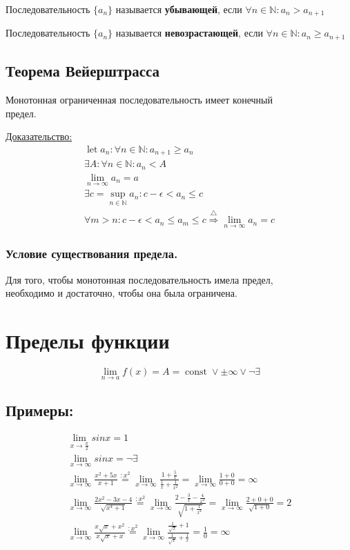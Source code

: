 \documentclass{article}
\DeclareMathOperator*{\Let}{let}
\DeclareMathOperator*{\Const}{const}
\begin{document}
Последовательность $\{ a_n \}$ называется \textbf{убывающей}, если $\forall n \in \mathbb{N} : a_n > a_{n + 1}$

Последовательность $\{ a_n \}$ называется \textbf{невозрастающей}, если $\forall n \in \mathbb{N} : a_n \ge a_{n + 1}$

\subsection{Теорема Вейерштрасса}

Монотонная ограниченная последовательность имеет конечный \\
предел.

\underline{Доказательство:}
\begin{gather*}
	\Let a_n : \forall n \in \mathbb{N} : a_{n + 1} \ge a_n \\
	\exists A : \forall n \in \mathbb{N} : a_n < A \\
	\lim_{n \to \infty} a_n = a \\
	\exists c = \sup_{n \in \mathbb{N}} a_n : c - \epsilon < a_n \le c \\
	\forall m > n : c - \epsilon < a_n \le a_m \le c 
	\stackrel{\triangle}{\Rightarrow} \lim_{n \to \infty} a_n = c
\end{gather*}

\subsubsection{Условие существования предела.}

Для того, чтобы монотонная последовательность имела предел, \\
необходимо и достаточно, чтобы она была ограничена.

\section{Пределы функции}

\[
\lim_{n \to a} f(x) = A = \Const \lor \pm \infty \lor \lnot \exists
\]

\subsection*{Примеры:}
\begin{gather*}
	\lim_{x \to \frac{\pi}{2}} sin x = 1 \\
	\lim_{x \to \infty} sin x = \lnot \exists \\
	\lim_{x \to \infty} \frac{x^2 + 5x}{x + 1} \stackrel{: x^2}{=}
	\lim_{x \to \infty} \frac{1 + \frac{5}{x}}{\frac{1}{x} + \frac{1}{x^2}} =
	\lim_{x \to \infty} \frac{1 + 0}{0 + 0} = \infty \\
	\lim_{x \to \infty} \frac{2x^2 - 3x - 4}{\sqrt{x^4 + 1}} \stackrel{: x^2}{=}
	\lim_{x \to \infty} \frac{2 - \frac{3}{x} - \frac{4}{x^2}}{\sqrt{1 + \frac{1}{x^4}}} =
	\lim_{x \to \infty} \frac{2 + 0 + 0}{\sqrt{1 + 0}} = 2 \\
	\lim_{x \to \infty} \frac{x\sqrt{x} + x^2}{x\sqrt{x} + x} \stackrel{: x^2}{=}
	\lim_{x \to \infty} \frac{\frac{1}{\sqrt{x}} + 1}{\frac{1}{\sqrt{x}} + \frac{1}{x}} =
	\frac{1}{0} = \infty
\end{gather*}
\end{document}
